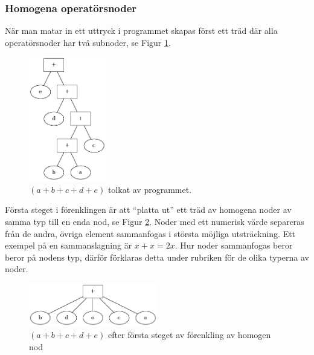 \documentclass[12pt,a4paper]{article}
\begin{document}
\subsubsection{Homogena operatörsnoder}
\label{subsec:homogena}
När man matar in ett uttryck i programmet skapas först ett träd där alla operatörsnoder har två subnoder, se Figur \ref{fig:2311}.
\begin{figure}[H]
  \centering
  \includegraphics[width=0.3\textwidth]{image22}
  \caption{\((a + b + c + d + e)\) tolkat av programmet.}
  \label{fig:2311}
\end{figure}
Första steget i förenklingen är att ``platta ut'' ett träd av homogena noder av samma typ till en enda nod, se Figur \ref{fig:2312}. Noder med ett numerisk värde separeras från de andra, övriga element sammanfogas i största möjliga utsträckning. Ett exempel på en sammanslagning är \(x + x = 2x \). Hur noder sammanfogas beror beror på nodens typ, därför förklaras detta under rubriken för de olika typerna av noder.
\begin{figure}[h!]
  \centering
  \includegraphics[width=0.5\textwidth]{image16}
  \caption{\((a + b + c + d + e)\) efter första steget av förenkling av homogen nod}
  \label{fig:2312}
\end{figure}
\end{document}
